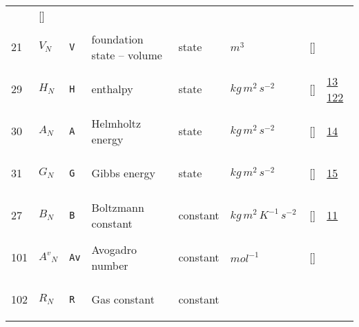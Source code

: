\begin{longtable}{|p{1cm}|p{3cm}|p{3cm}|p{7cm}|p{3.0cm}|p{3cm}|p{2cm}|p{1cm}|}
             & []
             & \\
    21
             & \hypertarget{"v:21"}{ $ {V}_{N} $}
             & \verb|V|
             & foundation state – volume
             & \begin{lay}state \end{lay}
             & $ m^{3} \, $
             & []
             & \\
    29
             & \hypertarget{"v:29"}{ $ {H}_{N} $}
             & \verb|H|
             & enthalpy
             & \begin{lay}state \end{lay}
             & $ kg \,m^{2} \,s^{-2} \, $
             & []
             & \hyperlink{"e:13"}{ 13 }
                 \hyperlink{"e:122"}{ 122 }
                 \\
    30
             & \hypertarget{"v:30"}{ $ {A}_{N} $}
             & \verb|A|
             & Helmholtz energy
             & \begin{lay}state \end{lay}
             & $ kg \,m^{2} \,s^{-2} \, $
             & []
             & \hyperlink{"e:14"}{ 14 }
                 \\
    31
             & \hypertarget{"v:31"}{ $ {G}_{N} $}
             & \verb|G|
             & Gibbs energy
             & \begin{lay}state \end{lay}
             & $ kg \,m^{2} \,s^{-2} \, $
             & []
             & \hyperlink{"e:15"}{ 15 }
                 \\
    27
             & \hypertarget{"v:27"}{ $ {B}_{N} $}
             & \verb|B|
             & Boltzmann constant
             & \begin{lay}constant \end{lay}
             & $ kg \,m^{2} \,K^{-1} \,s^{-2} \, $
             & []
             & \hyperlink{"e:11"}{ 11 }
                 \\
    101
             & \hypertarget{"v:101"}{ $ {A^{v}}_{N} $}
             & \verb|Av|
             & Avogadro number
             & \begin{lay}constant \end{lay}
             & $ mol^{-1} \, $
             & []
             & \\
    102
             & \hypertarget{"v:102"}{ $ {R}_{N} $}
             & \verb|R|
             & Gas constant
             & \begin{lay}constant \end{lay}

\end{longtable}
